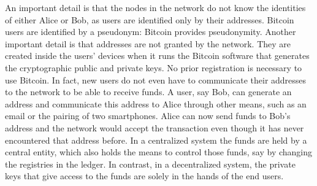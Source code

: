 \documentclass{article}
\begin{document}
\noindent An important detail is that the nodes in the network do not know the identities of either Alice or Bob, as users are identified only by their addresses. Bitcoin users are identified by a pseudonym: Bitcoin provides pseudonymity. Another important detail is that addresses are not granted by the network. They are created inside the users’ devices when it runs the Bitcoin software that generates the cryptographic public and private keys. No prior registration is necessary to use Bitcoin. In fact, new users do not even have to communicate their addresses to the network to be able to receive funds. A user, say Bob, can generate an address and communicate this address to Alice through other means, such as an email or the pairing of two smartphones. Alice can now send funds to Bob’s address and the network would accept the transaction even though it has never encountered that address before.\newline
In a centralized system the funds are held by a central entity, which also holds the means to control those funds, say by changing the registries in the ledger. In contrast, in a decentralized system, the private keys that give access to the funds are solely in the hands of the end users.
\end{document}
